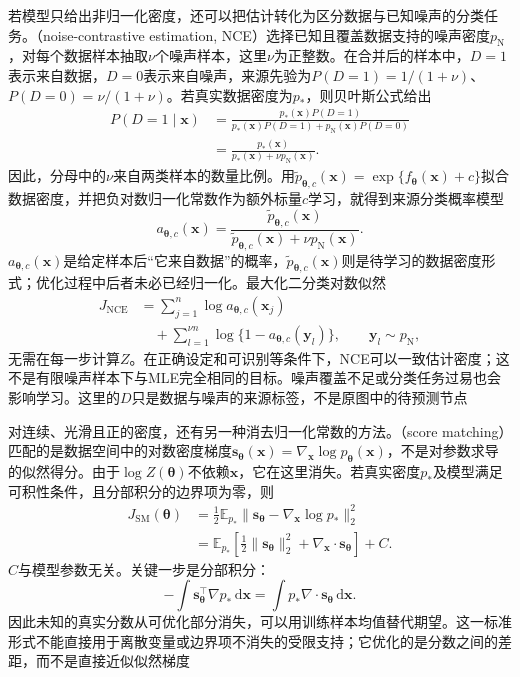 若模型只给出非归一化密度，还可以把估计转化为区分数据与已知噪声的分类任务。（noise-contrastive estimation, NCE）选择已知且覆盖数据支持的噪声密度$p_{\mathrm{N}}$，对每个数据样本抽取$\nu$个噪声样本，这里$\nu$为正整数。在合并后的样本中，$D=1$表示来自数据，$D=0$表示来自噪声，来源先验为$P(D=1)=1/(1+\nu)$、$P(D=0)=\nu/(1+\nu)$。若真实数据密度为$p_*$，则贝叶斯公式给出
\[
  \begin{aligned}
    P(D=1\mid\bm{x})
      &=\frac{p_*(\bm{x})P(D=1)}
        {p_*(\bm{x})P(D=1)+p_{\mathrm{N}}(\bm{x})P(D=0)}\\
      &=\frac{p_*(\bm{x})}
        {p_*(\bm{x})+\nu p_{\mathrm{N}}(\bm{x})}.
  \end{aligned}
\]
因此，分母中的$\nu$来自两类样本的数量比例。用$\widetilde p_{\bm{\theta},c}(\bm{x})=\exp\{f_{\bm{\theta}}(\bm{x})+c\}$拟合数据密度，并把负对数归一化常数作为额外标量$c$学习，就得到来源分类概率模型
\[
  a_{\bm{\theta},c}(\bm{x})
  =\frac{\widetilde p_{\bm{\theta},c}(\bm{x})}
         {\widetilde p_{\bm{\theta},c}(\bm{x})
                +\nu p_{\mathrm{N}}(\bm{x})}.
\]
$a_{\bm{\theta},c}(\bm{x})$是给定样本后“它来自数据”的概率，$\widetilde p_{\bm{\theta},c}(\bm{x})$则是待学习的数据密度形式；优化过程中后者未必已经归一化。最大化二分类对数似然
\[
  \begin{aligned}
    J_{\mathrm{NCE}}
      &=\sum_{j=1}^n\log a_{\bm{\theta},c}(\bm{x}_j)\\
      &\quad+\sum_{l=1}^{\nu n}
        \log\{1-a_{\bm{\theta},c}(\bm{y}_l)\},
        \qquad \bm{y}_l\sim p_{\mathrm{N}},
  \end{aligned}
\]
无需在每一步计算$Z$。在正确设定和可识别等条件下，NCE可以一致估计密度；这不是有限噪声样本下与MLE完全相同的目标。噪声覆盖不足或分类任务过易也会影响学习。这里的$D$只是数据与噪声的来源标签，不是原图中的待预测节点

对连续、光滑且正的密度，还有另一种消去归一化常数的方法。（score matching）匹配的是数据空间中的对数密度梯度$\bm{s}_{\bm{\theta}}(\bm{x})=\nabla_{\bm{x}}\log p_{\bm{\theta}}(\bm{x})$，不是对参数求导的似然得分。由于$\log Z(\bm{\theta})$不依赖$\bm{x}$，它在这里消失。若真实密度$p_*$及模型满足可积性条件，且分部积分的边界项为零，则
\begin{equation}
  \begin{aligned}
    J_{\mathrm{SM}}(\bm{\theta})
      &=\frac12\mathbb{E}_{p_*}
          \lVert\bm{s}_{\bm{\theta}}-\nabla_{\bm{x}}\log p_*\rVert_2^2\\
      &=\mathbb{E}_{p_*}\!\left[
          \frac12\lVert\bm{s}_{\bm{\theta}}\rVert_2^2+
          \nabla_{\bm{x}}\!\cdot\bm{s}_{\bm{\theta}}
        \right]+C.
  \end{aligned}
  \label{eq:pgm-parameter-learning-score-matching}
\end{equation}
$C$与模型参数无关。关键一步是分部积分：
\[
  -\int\bm{s}_{\bm{\theta}}^\top\nabla p_*\,\mathrm{d}\bm{x}
  =\int p_*\nabla\cdot\bm{s}_{\bm{\theta}}\,\mathrm{d}\bm{x}.
\]
因此未知的真实分数从可优化部分消失，可以用训练样本均值替代期望。这一标准形式不能直接用于离散变量或边界项不消失的受限支持；它优化的是分数之间的差距，而不是直接近似似然梯度

